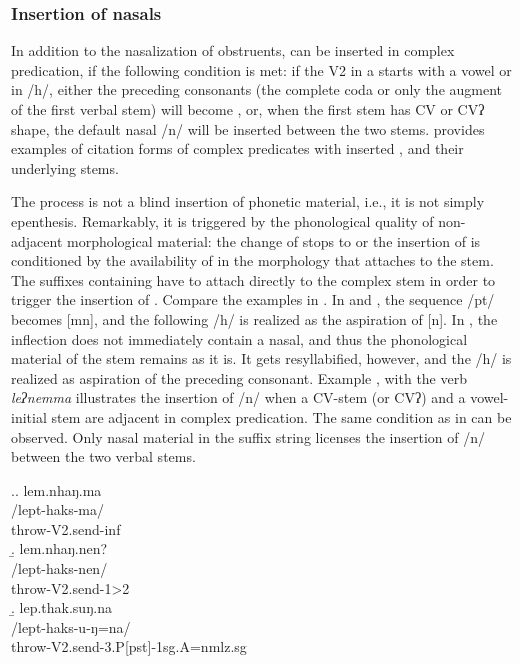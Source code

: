 \subsubsection{Insertion of nasals}

In addition to the nasalization of obstruents,  can be inserted in complex predication, if the following condition is met: if the V2 in a  starts with a vowel or in /h/, either the preceding consonants (the complete coda or only the augment of the first verbal stem) will become , or, when the first stem has CV or CVʔ shape, the default nasal /n/ will be inserted between the two stems.  provides examples of citation forms of complex predicates with inserted , and their underlying stems. 


The process is not a blind insertion of phonetic material, i.e., it is not simply epenthesis. Remarkably, it is triggered by the phonological quality of non-adjacent morphological material: the change of stops to  or the insertion of  is conditioned by the availability of  in the morphology that attaches to the stem. The suffixes containing  have to attach directly to the complex stem in order to trigger the insertion of . Compare the examples in \Next. In \Next[a] and \Next[b], the sequence /pt/ becomes [mn], and the following /h/ is realized  as the aspiration of [n]. In \Next[c], the inflection does not immediately contain a nasal, and thus the phonological material of the stem remains as it is. It gets resyllabified, however, and the /h/ is realized as aspiration of the preceding consonant. Example \NNext, with the verb \emph{leʔnemma}  illustrates the insertion of /n/ when a CV-stem (or CVʔ) and a vowel-initial stem are adjacent in complex predication. The same condition as in \Next can be observed. Only nasal material in the suffix string licenses the insertion of /n/ between the two verbal stems. 


\ex.\a. \glll lem.nhaŋ.ma\\
/lept-haks-ma/\\
throw{\sc -V2.send-inf}\\
\b. \glll lem.nhaŋ.nen?\\
/lept-haks-nen/\\
throw{\sc -V2.send-1>2}\\
\b. \glll lep.thak.suŋ.na\\
/lept-haks-u-ŋ=na/\\
throw{\sc -V2.send-3.P[pst]-1sg.A=nmlz.sg}\\

